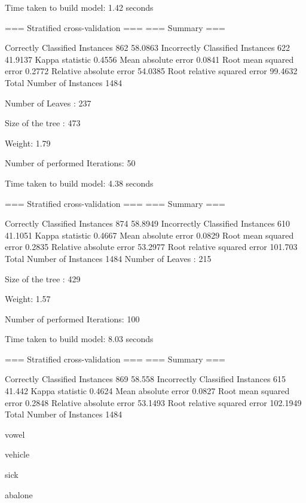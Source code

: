 Time taken to build model: 1.42 seconds

=== Stratified cross-validation ===
=== Summary ===

Correctly Classified Instances         862               58.0863 %
Incorrectly Classified Instances       622               41.9137 %
Kappa statistic                          0.4556
Mean absolute error                      0.0841
Root mean squared error                  0.2772
Relative absolute error                 54.0385 %
Root relative squared error             99.4632 %
Total Number of Instances             1484

Number of Leaves  : 	237

Size of the tree : 	473


Weight: 1.79

Number of performed Iterations: 50


Time taken to build model: 4.38 seconds

=== Stratified cross-validation ===
=== Summary ===

Correctly Classified Instances         874               58.8949 %
Incorrectly Classified Instances       610               41.1051 %
Kappa statistic                          0.4667
Mean absolute error                      0.0829
Root mean squared error                  0.2835
Relative absolute error                 53.2977 %
Root relative squared error            101.703  %
Total Number of Instances             1484     
Number of Leaves  : 	215

Size of the tree : 	429


Weight: 1.57

Number of performed Iterations: 100


Time taken to build model: 8.03 seconds

=== Stratified cross-validation ===
=== Summary ===

Correctly Classified Instances         869               58.558  %
Incorrectly Classified Instances       615               41.442  %
Kappa statistic                          0.4624
Mean absolute error                      0.0827
Root mean squared error                  0.2848
Relative absolute error                 53.1493 %
Root relative squared error            102.1949 %
Total Number of Instances             1484

vowel

vehicle

sick 

abalone